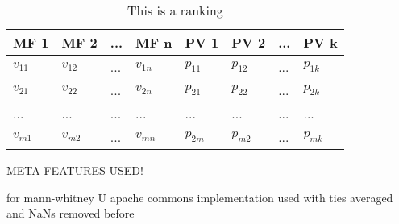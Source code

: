 \begin{table}[h]
\centering
	\begin{tabularx}{\textwidth}{X | X | X | X | X | X | X | X}
		MF 1				& MF 2				& ... 	& MF n				& PV 1 		& PV 2 		&	...	&	PV k 		\\ \hline
		$v_{11}$			& $v_{12}$			& ...	& $v_{1n}$			& $p_{11}$	& $p_{12}$	& 	...	&	$p_{1k}$		\\ \hline
		$v_{21}$			& $v_{22}$			& ...	& $v_{2n}$			& $p_{21}$	& $p_{22}$	& 	...	&	$p_{2k}$		\\ \hline
		...				& ...				& ...	& ...				& ...		& ...		&	...	&	...			\\ \hline
		$v_{m1}$			& $v_{m2}$			& ... 	& $v_{mn}$			& $p_{2m}$	& $p_{m2}$	& 	...	&	$p_{mk}$			 
	\end{tabularx}
	\label{tab:table1}
	\caption{This is a ranking}
\end{table}

META FEATURES USED!


for mann-whitney U apache commons implementation used with ties averaged and NaNs removed before